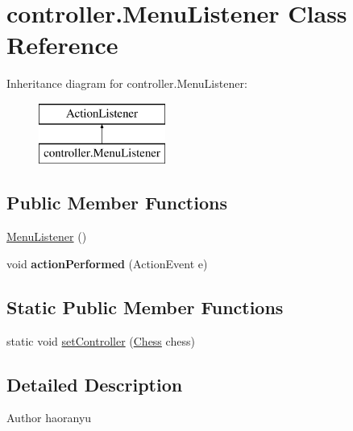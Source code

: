 \hypertarget{classcontroller_1_1_menu_listener}{\section{controller.\+Menu\+Listener Class Reference}
\label{classcontroller_1_1_menu_listener}
}
Inheritance diagram for controller.\+Menu\+Listener\+:\begin{figure}[H]
\begin{center}
\leavevmode
\includegraphics[height=2.000000cm]{classcontroller_1_1_menu_listener}
\end{center}
\end{figure}
\subsection*{Public Member Functions}
\begin{DoxyCompactItemize}
\item 
\hyperlink{classcontroller_1_1_menu_listener_a2c2ec5b3a595801a3aa16278b15e0663}{Menu\+Listener} ()
\item 
\hypertarget{classcontroller_1_1_menu_listener_ac9c24ac086e2bd95a22501a24db1d17c}{void {\bfseries action\+Performed} (Action\+Event e)}\label{classcontroller_1_1_menu_listener_ac9c24ac086e2bd95a22501a24db1d17c}

\end{DoxyCompactItemize}
\subsection*{Static Public Member Functions}
\begin{DoxyCompactItemize}
\item 
static void \hyperlink{classcontroller_1_1_menu_listener_a0371555cb4d13ddc3f1d5ad3432db5e9}{set\+Controller} (\hyperlink{classcontroller_1_1_chess}{Chess} chess)
\end{DoxyCompactItemize}


\subsection{Detailed Description}
\begin{DoxyAuthor}{Author}
haoranyu 
\end{DoxyAuthor}


